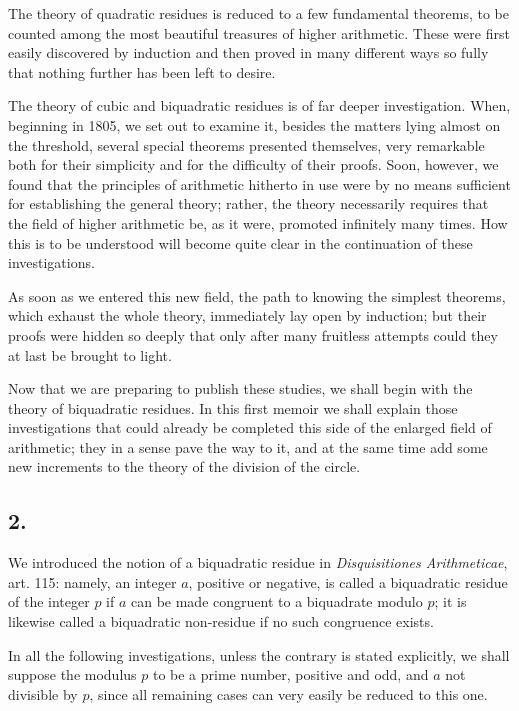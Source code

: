 \documentclass[12pt]{article}
\begin{document}
The theory of quadratic residues is reduced to a few fundamental theorems, to be counted among the most beautiful treasures of higher arithmetic. These were first easily discovered by induction and then proved in many different ways so fully that nothing further has been left to desire.

The theory of cubic and biquadratic residues is of far deeper investigation. When, beginning in 1805, we set out to examine it, besides the matters lying almost on the threshold, several special theorems presented themselves, very remarkable both for their simplicity and for the difficulty of their proofs. Soon, however, we found that the principles of arithmetic hitherto in use were by no means sufficient for establishing the general theory; rather, the theory necessarily requires that the field of higher arithmetic be, as it were, promoted infinitely many times. How this is to be understood will become quite clear in the continuation of these investigations.

As soon as we entered this new field, the path to knowing the simplest theorems, which exhaust the whole theory, immediately lay open by induction; but their proofs were hidden so deeply that only after many fruitless attempts could they at last be brought to light.

Now that we are preparing to publish these studies, we shall begin with the theory of biquadratic residues. In this first memoir we shall explain those investigations that could already be completed this side of the enlarged field of arithmetic; they in a sense pave the way to it, and at the same time add some new increments to the theory of the division of the circle.

\subsection*{2.}

We introduced the notion of a biquadratic residue in \emph{Disquisitiones Arithmeticae}, art. 115: namely, an integer $a$, positive or negative, is called a biquadratic residue of the integer $p$ if $a$ can be made congruent to a biquadrate modulo $p$; it is likewise called a biquadratic non-residue if no such congruence exists.

In all the following investigations, unless the contrary is stated explicitly, we shall suppose the modulus $p$ to be a prime number, positive and odd, and $a$ not divisible by $p$, since all remaining cases can very easily be reduced to this one.
\end{document}
